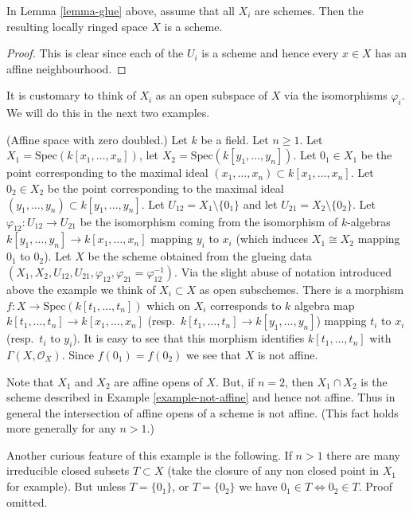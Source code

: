 \begin{lemma}
\label{lemma-glue-schemes}
In Lemma \ref{lemma-glue} above, assume that all
$X_i$ are schemes. Then the resulting locally ringed
space $X$ is a scheme.
\end{lemma}

\begin{proof}
This is clear since each of the $U_i$ is a scheme
and hence every $x \in X$ has an affine neighbourhood.
\end{proof}

\noindent
It is customary to think of $X_i$ as an open subspace of
$X$ via the isomorphisms $\varphi_i$. We will do this in
the next two examples.

\begin{example}
\label{example-affine-space-zero-doubled}
(Affine space with zero doubled.)
Let $k$ be a field. Let $n \geq 1$.
Let $X_1 = \text{Spec}(k[x_1, \ldots, x_n])$,
let $X_2 = \text{Spec}(k[y_1, \ldots, y_n])$.
Let $0_1 \in X_1$ be the point corresponding to the maximal ideal
$(x_1, \ldots, x_n) \subset k[x_1, \ldots, x_n]$.
Let $0_2 \in X_2$ be the point corresponding to the maximal ideal
$(y_1, \ldots, y_n) \subset k[y_1, \ldots, y_n]$.
Let $U_{12} = X_1 \setminus \{0_1\}$ and
let $U_{21} = X_2 \setminus \{0_2\}$. Let
$\varphi_{12} : U_{12} \to U_{21}$ be the isomorphism
coming from the isomorphism of $k$-algebras
$k[y_1, \ldots, y_n] \to k[x_1, \ldots, x_n]$
mapping $y_i$ to $x_i$ (which induces $X_1 \cong X_2$ mapping
$0_1$ to $0_2$).
Let $X$ be the scheme obtained from the glueing data
$(X_1, X_2, U_{12}, U_{21}, \varphi_{12},
\varphi_{21} = \varphi_{12}^{-1})$. Via the slight abuse
of notation introduced above the example we think of
$X_i \subset X$ as open subschemes.
There is a morphism $f : X \to \text{Spec}(k[t_1, \ldots, t_n])$
which on $X_i$ corresponds to $k$ algebra map
$k[t_1, \ldots, t_n] \to k[x_1, \ldots, x_n]$
(resp.\ $k[t_1, \ldots, t_n] \to k[y_1, \ldots, y_n]$)
mapping $t_i$ to $x_i$ (resp.\  $t_i$ to $y_i$).
It is easy to see that this morphism identifies
$k[t_1, \ldots, t_n]$ with $\Gamma(X, \mathcal{O}_X)$. Since
$f(0_1) = f(0_2)$ we see that $X$ is not affine.

\medskip\noindent
Note that $X_1$ and $X_2$ are affine opens of $X$.
But, if $n = 2$, then $X_1 \cap X_2$ is the scheme
described in Example \ref{example-not-affine} and hence not affine.
Thus in general the intersection of affine opens of a scheme
is not affine. (This fact holds more generally for any $n > 1$.)

\medskip\noindent
Another curious feature of this example is the following.
If $n > 1$ there are many irreducible closed subsets $T \subset X$
(take the closure of any non closed point in $X_1$ for example).
But unless $T = \{0_1\}$, or $T = \{0_2\}$ we have
$0_1 \in T \Leftrightarrow 0_2 \in T$. Proof omitted.
\end{example}

